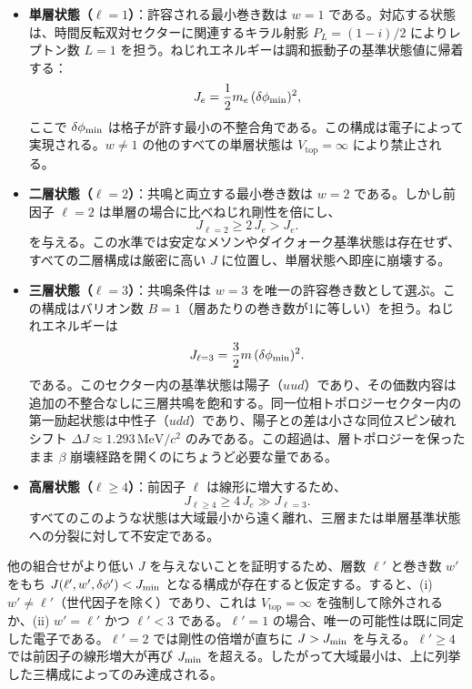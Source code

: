 \documentclass[a4paper]{article}
\begin{document}
\begin{itemize}
\item \textbf{単層状態（\(\ell=1\)）}：許容される最小巻き数は \(w=1\) である。対応する状態は、時間反転双対セクターに関連するキラル射影 \(P_L = (1-i)/2\) によりレプトン数 \(L=1\) を担う。ねじれエネルギーは調和振動子の基準状態値に帰着する：
  \[
  J_{e} = \frac12 m_e \,(\delta\phi_{\rm min})^2,
  \]
  ここで \(\delta\phi_{\rm min}\) は格子が許す最小の不整合角である。この構成は電子によって実現される。\(w\neq1\) の他のすべての単層状態は \(V_\text{top}=\infty\) により禁止される。

\item \textbf{二層状態（\(\ell=2\)）}：共鳴と両立する最小巻き数は \(w=2\) である。しかし前因子 \(\ell=2\) は単層の場合に比べねじれ剛性を倍にし、
  \[
  J_{\ell=2} \ge 2\,J_e > J_e.
  \]
  を与える。この水準では安定なメソンやダイクォーク基準状態は存在せず、すべての二層構成は厳密に高い \(J\) に位置し、単層状態へ即座に崩壊する。

\item \textbf{三層状態（\(\ell=3\)）}：共鳴条件は \(w=3\) を唯一の許容巻き数として選ぶ。この構成はバリオン数 \(B=1\)（層あたりの巻き数が1に等しい）を担う。ねじれエネルギーは
  \[
  J_{\ell=3} = \frac32 m \,(\delta\phi_{\rm min})^2.
  \]
  である。このセクター内の基準状態は陽子（\(uud\)）であり、その価数内容は追加の不整合なしに三層共鳴を飽和する。同一位相トポロジーセクター内の第一励起状態は中性子（\(udd\)）であり、陽子との差は小さな同位スピン破れシフト \(\Delta J \approx 1.293\,\mathrm{MeV}/c^2\) のみである。この超過は、層トポロジーを保ったまま \(\beta\) 崩壊経路を開くのにちょうど必要な量である。

\item \textbf{高層状態（\(\ell\ge4\)）}：前因子 \(\ell\) は線形に増大するため、
  \[
  J_{\ell\ge4} \ge 4\,J_e \gg J_{\ell=3}.
  \]
  すべてのこのような状態は大域最小から遠く離れ、三層または単層基準状態への分裂に対して不安定である。
\end{itemize}

他の組合せがより低い \(J\) を与えないことを証明するため、層数 \(\ell'\) と巻き数 \(w'\) をもち \(J(\ell',w',\delta\phi') < J_{\rm min}\) となる構成が存在すると仮定する。すると、(i) \(w'\neq\ell'\)（世代因子を除く）であり、これは \(V_\text{top}=\infty\) を強制して除外されるか、(ii) \(w'=\ell'\) かつ \(\ell' < 3\) である。\(\ell'=1\) の場合、唯一の可能性は既に同定した電子である。\(\ell'=2\) では剛性の倍増が直ちに \(J> J_{\rm min}\) を与える。\(\ell'\ge4\) では前因子の線形増大が再び \(J_{\rm min}\) を超える。したがって大域最小は、上に列挙した三構成によってのみ達成される。
\end{document}
